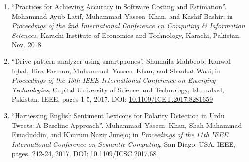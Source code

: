 \documentclass[a4paper, 10pt]{article}
\begin{document}
\begin{enumerate}
 
  
  \item ``Practices for Achieving Accuracy in Software Costing and Estimation''. Mohammad Ayub Latif, \textcolor{NavyBlue}{Muhammad~Yaseen~Khan}, and Kashif Bashir; in \emph{Proceedings of the 2nd International Conference on Computing \& Information Sciences}, Karachi Institute of Economics and Technology, Karachi, Pakistan. Nov. 2018.
  
  \item ``Drive pattern analyzer using smartphones''. Shumaila Mahboob, Kanwal Iqbal, Hira Farman, \textcolor{NavyBlue}{Muhammad~Yaseen~Khan}, and Shaukat Wasi; in \emph{ Proceedings of the 13th IEEE International Conference on Emerging Technologies}, Capital University of Science and Technology, Islamabad, Pakistan. IEEE, pages 1-5, 2017. DOI: \href{https://doi.org/10.1109/ICET.2017.8281659}{10.1109/ICET.2017.8281659}
  
  \item ``Harnessing English Sentiment Lexicons for Polarity Detection in Urdu Tweets: A Baseline Approach''. \textcolor{NavyBlue}{Muhammad~Yaseen~Khan}, Shah Muhammad Emaduddin, and Khurum Nazir Junejo;  in \emph{Proceedings of the 11th IEEE International Conference on Semantic Computing}, San Diago, USA. IEEE, pages. 242-24, 2017. DOI: \href{https://doi.org/10.1109/ICSC.2017.68}{10.1109/ICSC.2017.68}
\end{enumerate}
\end{document}
